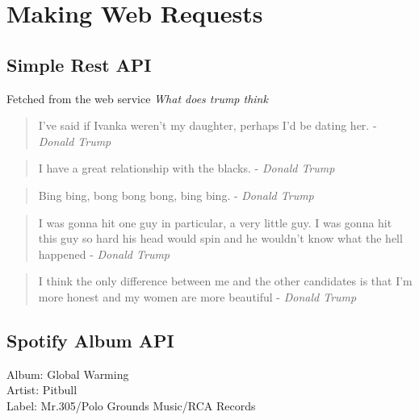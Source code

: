 \documentclass{article}
\begin{document}
  

  \section{Making Web Requests}
  \label{sec:Making Web Requests}

    \subsection{Simple Rest API}
    \label{sub:Simple Rest API}
      Fetched from the web service \textit{What does trump think}\\
                    \begin{quote}
          I've said if Ivanka weren't my daughter, perhaps I'd be dating her. - \textit{Donald Trump}
        \end{quote}
                    \begin{quote}
          I have a great relationship with the blacks. - \textit{Donald Trump}
        \end{quote}
                    \begin{quote}
          Bing bing, bong bong bong, bing bing. - \textit{Donald Trump}
        \end{quote}
                    \begin{quote}
          I was gonna hit one guy in particular, a very little guy. I was gonna hit this guy so hard his head would spin and he wouldn’t know what the hell happened - \textit{Donald Trump}
        \end{quote}
                    \begin{quote}
          I think the only difference between me and the other candidates is that I'm more honest and my women are more beautiful - \textit{Donald Trump}
        \end{quote}
      

    \subsection{Spotify Album API}
    \label{sub:Spotify Album API}
        Album: Global Warming \\
    Artist: Pitbull \\
    Label: Mr.305/Polo Grounds Music/RCA Records \\
\end{document}
